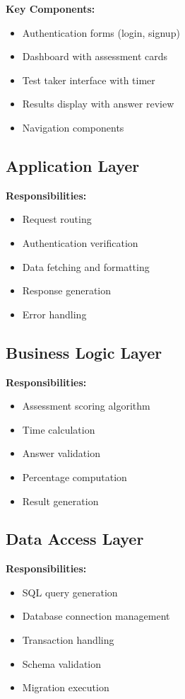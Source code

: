 \documentclass[12pt,a4paper]{report}
\begin{document}
\textbf{Key Components:}
\begin{itemize}
    \item Authentication forms (login, signup)
    \item Dashboard with assessment cards
    \item Test taker interface with timer
    \item Results display with answer review
    \item Navigation components
\end{itemize}

\subsection{Application Layer}

\textbf{Responsibilities:}
\begin{itemize}
    \item Request routing
    \item Authentication verification
    \item Data fetching and formatting
    \item Response generation
    \item Error handling
\end{itemize}

\subsection{Business Logic Layer}

\textbf{Responsibilities:}
\begin{itemize}
    \item Assessment scoring algorithm
    \item Time calculation
    \item Answer validation
    \item Percentage computation
    \item Result generation
\end{itemize}

\subsection{Data Access Layer}

\textbf{Responsibilities:}
\begin{itemize}
    \item SQL query generation
    \item Database connection management
    \item Transaction handling
    \item Schema validation
    \item Migration execution
\end{itemize}
\end{document}
